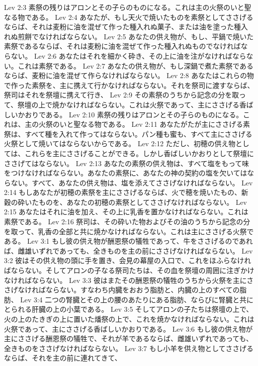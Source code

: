 Lev 2:3  素祭の残りはアロンとその子らのものになる。これは主の火祭のいと聖なる物である。
Lev 2:4  あなたが、もし天火で焼いたものを素祭としてささげるならば、それは麦粉に油を混ぜて作った種入れぬ菓子、または油を塗った種入れぬ煎餅でなければならない。
Lev 2:5  あなたの供え物が、もし、平鍋で焼いた素祭であるならば、それは麦粉に油を混ぜて作った種入れぬものでなければならない。
Lev 2:6  あなたはそれを細かく砕き、その上に油を注がなければならない。これは素祭である。
Lev 2:7  あなたの供え物が、もし深鍋で煮た素祭であるならば、麦粉に油を混ぜて作らなければならない。
Lev 2:8  あなたはこれらの物で作った素祭を、主に携えて行かなければならない。それを祭司に渡すならば、祭司はそれを祭壇に携えて行き、
Lev 2:9  その素祭のうちから記念の分を取って、祭壇の上で焼かなければならない。これは火祭であって、主にささげる香ばしいかおりである。
Lev 2:10  素祭の残りはアロンとその子らのものになる。これは、主の火祭のいと聖なる物である。
Lev 2:11  あなたがたが主にささげる素祭は、すべて種を入れて作ってはならない。パン種も蜜も、すべて主にささげる火祭として焼いてはならないからである。
Lev 2:12  ただし、初穂の供え物としては、これらを主にささげることができる。しかし香ばしいかおりとして祭壇にささげてはならない。
Lev 2:13  あなたの素祭の供え物は、すべて塩をもって味をつけなければならない。あなたの素祭に、あなたの神の契約の塩を欠いてはならない。すべて、あなたの供え物は、塩を添えてささげなければならない。
Lev 2:14  もしあなたが初穂の素祭を主にささげるならば、火で穂を焼いたもの、新穀の砕いたものを、あなたの初穂の素祭としてささげなければならない。
Lev 2:15  あなたはそれに油を加え、その上に乳香を置かなければならない。これは素祭である。
Lev 2:16  祭司は、その砕いた物およびその油のうちから記念の分を取って、乳香の全部と共に焼かなければならない。これは主にささげる火祭である。
Lev 3:1  もし彼の供え物が酬恩祭の犠牲であって、牛をささげるのであれば、雌雄いずれであっても、全きものを主の前にささげなければならない。
Lev 3:2  彼はその供え物の頭に手を置き、会見の幕屋の入口で、これをほふらなければならない。そしてアロンの子なる祭司たちは、その血を祭壇の周囲に注ぎかけなければならない。
Lev 3:3  彼はまたその酬恩祭の犠牲のうちから火祭を主にささげなければならない。すなわち内臓をおおう脂肪と、内臓の上のすべての脂肪、
Lev 3:4  二つの腎臓とその上の腰のあたりにある脂肪、ならびに腎臓と共にとられる肝臓の上の小葉である。
Lev 3:5  そしてアロンの子たちは祭壇の上で、火の上のたきぎの上に置いた燔祭の上で、これを焼かなければならない。これは火祭であって、主にささげる香ばしいかおりである。
Lev 3:6  もし彼の供え物が主にささげる酬恩祭の犠牲で、それが羊であるならば、雌雄いずれであっても、全きものをささげなければならない。
Lev 3:7  もし小羊を供え物としてささげるならば、それを主の前に連れてきて、

